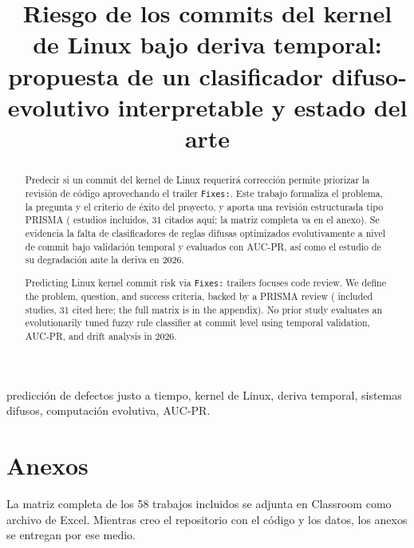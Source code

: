 \documentclass[conference,letterpaper]{IEEEtran}
\begin{document}
\title{Riesgo de los commits del kernel de Linux bajo deriva temporal: propuesta de un clasificador difuso-evolutivo interpretable y estado del arte}

\author{
}

\maketitle

\begin{abstract}
Predecir si un commit del kernel de Linux requerirá corrección permite priorizar la revisión de código aprovechando el trailer \texttt{Fixes:}. Este trabajo formaliza el problema, la pregunta y el criterio de éxito del proyecto, y aporta una revisión estructurada tipo PRISMA (\nTotalIncluidos{} estudios incluidos, 31 citados aquí; la matriz completa va en el anexo). Se evidencia la falta de clasificadores de reglas difusas optimizados evolutivamente a nivel de commit bajo validación temporal y evaluados con AUC-PR, así como el estudio de su degradación ante la deriva en 2026.
\end{abstract}

\begingroup\renewcommand{\abstractname}{Abstract}
\begin{abstract}
Predicting Linux kernel commit risk via \texttt{Fixes:} trailers focuses code review. We define the problem, question, and success criteria, backed by a PRISMA review (\nTotalIncluidos{} included studies, 31 cited here; the full matrix is in the appendix). No prior study evaluates an evolutionarily tuned fuzzy rule classifier at commit level using temporal validation, AUC-PR, and drift analysis in 2026.
\end{abstract}\endgroup

\begin{IEEEkeywords}
predicción de defectos justo a tiempo, kernel de Linux, deriva temporal, sistemas difusos, computación evolutiva, AUC-PR.
\end{IEEEkeywords}





\section*{Anexos}
La matriz completa de los 58 trabajos incluidos se adjunta en Classroom como archivo de Excel. Mientras creo el repositorio con el código y los datos, los anexos se entregan por ese medio.




\end{document}
